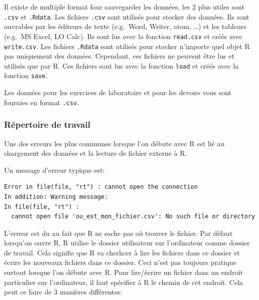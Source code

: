 \documentclass[12pt,]{book}
\makeatletter
\newenvironment{kframe}{%
\medskip{}
\setlength{\fboxsep}{.8em}
 \def\at@end@of@kframe{}%
 \ifinner\ifhmode%
  \def\at@end@of@kframe{\end{minipage}}%
  \begin{minipage}{\columnwidth}%
 \fi\fi%
 \def\FrameCommand##1{\hskip\@totalleftmargin \hskip-\fboxsep
 \colorbox{shadecolor}{##1}\hskip-\fboxsep
     \hskip-\linewidth \hskip-\@totalleftmargin \hskip\columnwidth}%
 \MakeFramed {\advance\hsize-\width
   \@totalleftmargin\z@ \linewidth\hsize
   \@setminipage}}%
 {\par\unskip\endMakeFramed%
 \at@end@of@kframe}
\newenvironment{rmdblock}[1]
  {
  \begin{itemize}
  \renewcommand{\labelitemi}{
    \raisebox{-.7\height}[0pt][0pt]{
      {\setkeys{Gin}{width=3em,keepaspectratio}\texttt{[image: images/\#1]}}
    }
  }
  \setlength{\fboxsep}{1em}
  \begin{kframe}
  \item
  }
  {
  \end{kframe}
  \end{itemize}
  }
\newenvironment{rmdwarning}
  {\begin{rmdblock}{warning}}
  {\end{rmdblock}}
\makeatother
\begin{document}
Il existe de multiple format four sauvegarder les données, les 2 plus utiles sont \texttt{.csv} et \texttt{.Rdata}.
Les fichiers \texttt{.csv} sont utilisés pour stocker des données.
Ils sont ouvrables par les éditeurs de texte (e.g.~Word, Writer, atom, \ldots{}) et les tableurs (e.g.~MS Excel, LO Calc).
Ils sont lus avec la fonction \texttt{read.csv} et créés avec \texttt{write.csv}.
Les fichiers \texttt{.Rdata} sont utilisés pour stocker n'importe quel objet R pas uniquement des données.
Cependant, ces fichiers ne peuvent être lus et utilisés que par R.
Ces fichiers sont lus avec la fonction \texttt{load} et créés avec la fonction \texttt{save}.

Les données pour les exercices de laboratoire et pour les devoirs vous sont fournies en format \texttt{.csv}.

\hypertarget{ruxe9pertoire-de-travail}{%
\subsubsection{Répertoire de travail}\label{ruxe9pertoire-de-travail}}

\begin{rmdwarning}
Une des erreurs les plus communes lorsque l'on débute avec R est lié au chargement des données et la lecture de fichier externe à R.
\end{rmdwarning}
Un message d'erreur typique est:

\begin{verbatim}
Error in file(file, "rt") : cannot open the connection
In addition: Warning message:
In file(file, "rt") :
  cannot open file 'ou_est_mon_fichier.csv': No such file or directory
\end{verbatim}

L'erreur est du au fait que R ne sache pas où trouver le fichier. Par défaut lorsqu'on ouvre R, R utilise le dossier utilisateur sur l'ordinateur comme dossier de travail. Cela signifie que R va cherhcer à lire les fichiers dans ce dossier et écrire les nouveaux fichiers dans ce dossier. Ceci n'est pas toujours pratique surtout lorsque l'on débute avec R.
Pour lire/écrire un fichier dans un endroit particulier sur l'ordinateur, il faut spécifier à R le chemin de cet endroit. Cela peut ce faire de 3 manières différentes:
\end{document}
